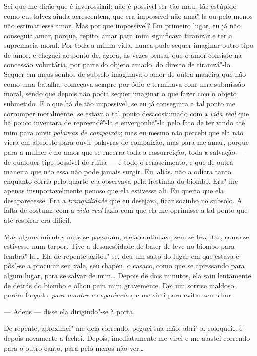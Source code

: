 Sei que me dirão que é inverossímil: não é possível ser tão mau, tão
estúpido como eu; talvez ainda acrescentem, que era impossível não
amá"-la ou pelo menos não estimar esse amor. Mas por que impossível? Em
primeiro lugar, eu já não conseguia amar, porque, repito, amar para mim
significava tiranizar e ter a supremacia moral. Por toda a minha vida,
nunca pude sequer imaginar outro tipo de amor, e cheguei ao ponto de,
agora, às vezes pensar que o amor consiste na concessão voluntária, por
parte do objeto amado, do direito de tiranizá"-lo. Sequer em meus sonhos
de subsolo imaginava o amor de outra maneira que não como uma batalha;
começava sempre por ódio e terminava com uma submissão moral, sendo que
depois não podia sequer imaginar o que fazer com o objeto submetido. E
o que há de tão impossível, se eu já conseguira a tal ponto me
corromper moralmente, se estava a tal ponto desacostumado com a \textit{vida
real} que há pouco inventara de repreendê"-la e envergonhá"-la pelo fato
de ter vindo até mim para ouvir \textit{palavras de compaixão}; mas eu mesmo
não percebi que ela não viera em absoluto para ouvir palavras de
compaixão, mas para me amar, porque para a mulher é no amor que se
encerra toda a ressurreição, toda a salvação --- de qualquer tipo
possível de ruína --- e todo o renascimento, e que de outra maneira que
não essa não pode jamais surgir. Eu, aliás, não a odiara tanto enquanto
corria pelo quarto e a observava pela frestinha do biombo. Era"-me
apenas insuportavelmente penoso que ela estivesse ali. Eu queria que
ela desaparecesse. Era a \textit{tranquilidade} que eu desejava, ficar sozinho
no subsolo. A falta de costume com a \textit{vida real} fazia com que ela me
oprimisse a tal ponto que até respirar era difícil.

Mas alguns minutos mais se passaram, e ela continuava sem se levantar, como se
estivesse num torpor. Tive a desonestidade de bater de leve no biombo para
lembrá"-la\ldots{} Ela de repente agitou"-se, deu um salto do lugar em que estava
e pôs"-se a procurar seu xale, seu chapéu, o casaco, como que se apressando para
algum lugar, para se salvar de mim\ldots{} Depois de dois minutos, ela saiu
lentamente de detrás do biombo e olhou para mim gravemente. Dei um sorriso
maldoso, porém forçado, \textit{para manter as aparências}, e me virei para
evitar seu olhar.

--- Adeus --- disse ela dirigindo"-se à porta.

De repente, aproximei"-me dela correndo, peguei sua mão, abri"-a,
coloquei\ldots{} e depois novamente a fechei. Depois, imediatamente me virei
e me afastei correndo para o outro canto, para pelo menos não ver\ldots{}

